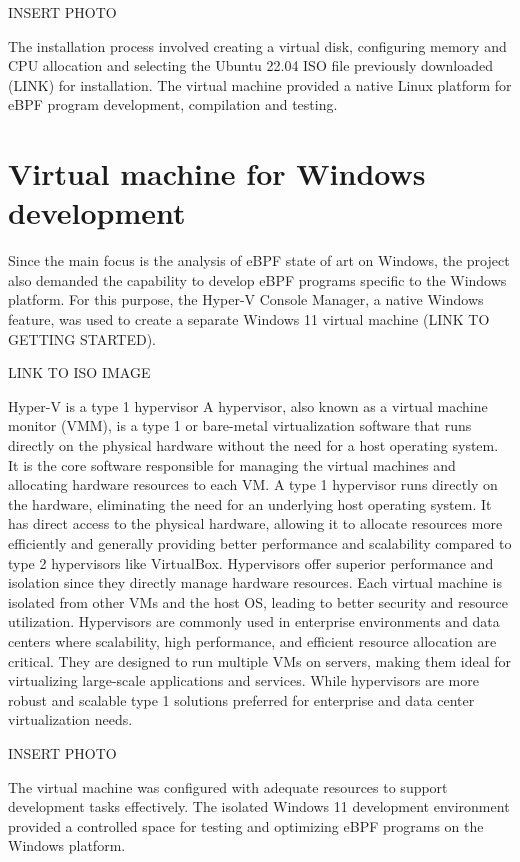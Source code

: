INSERT PHOTO

The installation process involved creating a virtual disk, configuring memory and CPU allocation and selecting the Ubuntu 22.04 ISO file previously downloaded (LINK) for installation. 
The virtual machine provided a native Linux platform for eBPF program development, compilation and testing.

\section{Virtual machine for Windows development}

Since the main focus is the analysis of eBPF state of art on Windows, the project also demanded the capability to develop eBPF programs specific to the Windows platform. 
For this purpose, the Hyper-V Console Manager, a native Windows feature, was used to create a separate Windows 11 virtual machine (LINK TO GETTING STARTED).

LINK TO ISO IMAGE

Hyper-V is a type 1 hypervisor
A hypervisor, also known as a virtual machine monitor (VMM), is a type 1 or bare-metal virtualization software that runs directly on the physical hardware without the need for a host operating system. It is the core software responsible for managing the virtual machines and allocating hardware resources to each VM.
A type 1 hypervisor runs directly on the hardware, eliminating the need for an underlying host operating system. It has direct access to the physical hardware, allowing it to allocate resources more efficiently and generally providing better performance and scalability compared to type 2 hypervisors like VirtualBox.
Hypervisors offer superior performance and isolation since they directly manage hardware resources. Each virtual machine is isolated from other VMs and the host OS, leading to better security and resource utilization.
Hypervisors are commonly used in enterprise environments and data centers where scalability, high performance, and efficient resource allocation are critical. They are designed to run multiple VMs on servers, making them ideal for virtualizing large-scale applications and services.
While hypervisors are more robust and scalable type 1 solutions preferred for enterprise and data center virtualization needs.

INSERT PHOTO

The virtual machine was configured with adequate resources to support development tasks effectively. 
The isolated Windows 11 development environment provided a controlled space for testing and optimizing eBPF programs on the Windows platform.

